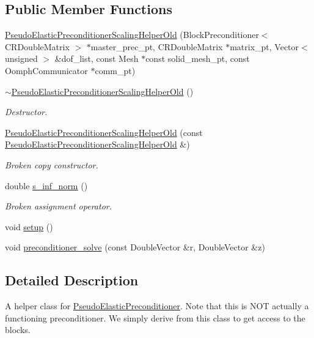 \subsection*{Public Member Functions}
\begin{DoxyCompactItemize}
\item 
\hyperlink{classoomph_1_1PseudoElasticPreconditionerScalingHelperOld_a90a89541c9067f06446c2a0e9e3c5398}{Pseudo\+Elastic\+Preconditioner\+Scaling\+Helper\+Old} (Block\+Preconditioner$<$ C\+R\+Double\+Matrix $>$ $\ast$master\+\_\+prec\+\_\+pt, C\+R\+Double\+Matrix $\ast$matrix\+\_\+pt, Vector$<$ unsigned $>$ \&dof\+\_\+list, const Mesh $\ast$const solid\+\_\+mesh\+\_\+pt, const Oomph\+Communicator $\ast$comm\+\_\+pt)
\item 
\hyperlink{classoomph_1_1PseudoElasticPreconditionerScalingHelperOld_a330a6acc2a56bf439f0b3d603d392cf8}{$\sim$\+Pseudo\+Elastic\+Preconditioner\+Scaling\+Helper\+Old} ()
\begin{DoxyCompactList}\small\item\em Destructor. \end{DoxyCompactList}\item 
\hyperlink{classoomph_1_1PseudoElasticPreconditionerScalingHelperOld_acfd02d4f3aa04aa04485f2cc8678de5f}{Pseudo\+Elastic\+Preconditioner\+Scaling\+Helper\+Old} (const \hyperlink{classoomph_1_1PseudoElasticPreconditionerScalingHelperOld}{Pseudo\+Elastic\+Preconditioner\+Scaling\+Helper\+Old} \&)
\begin{DoxyCompactList}\small\item\em Broken copy constructor. \end{DoxyCompactList}\item 
double \hyperlink{classoomph_1_1PseudoElasticPreconditionerScalingHelperOld_a4774c6db30bd4f7d054e438add48f7eb}{s\+\_\+inf\+\_\+norm} ()
\begin{DoxyCompactList}\small\item\em Broken assignment operator. \end{DoxyCompactList}\item 
void \hyperlink{classoomph_1_1PseudoElasticPreconditionerScalingHelperOld_a42dca15c6f3678880f3b84ccb91513c7}{setup} ()
\item 
void \hyperlink{classoomph_1_1PseudoElasticPreconditionerScalingHelperOld_a185bc08ce33f220d9ef61745b46e0633}{preconditioner\+\_\+solve} (const Double\+Vector \&r, Double\+Vector \&z)
\end{DoxyCompactItemize}


\subsection{Detailed Description}
A helper class for \hyperlink{classoomph_1_1PseudoElasticPreconditioner}{Pseudo\+Elastic\+Preconditioner}. Note that this is N\+OT actually a functioning preconditioner. We simply derive from this class to get access to the blocks. 

